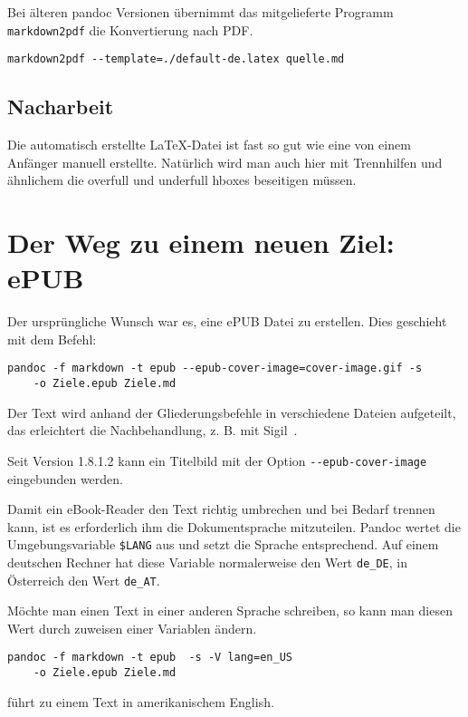 \documentclass[11pt,ngerman,a4paper]{article}
\begin{document}
Bei älteren pandoc Versionen übernimmt das mitgelieferte Programm
\texttt{markdown2pdf} die Konvertierung nach PDF.

\begin{verbatim}
markdown2pdf --template=./default-de.latex quelle.md
\end{verbatim}

\subsection{Nacharbeit}

Die automatisch erstellte LaTeX-Datei ist fast so gut wie eine von einem
Anfänger manuell erstellte. Natürlich wird man auch hier mit Trennhilfen
und ähnlichem die overfull und underfull hboxes beseitigen müssen.

\section{Der Weg zu einem neuen Ziel: ePUB}

Der ursprüngliche Wunsch war es, eine ePUB Datei zu erstellen. Dies
geschieht mit dem Befehl:

\begin{verbatim}
pandoc -f markdown -t epub --epub-cover-image=cover-image.gif -s
    -o Ziele.epub Ziele.md
\end{verbatim}

Der Text wird anhand der Gliederungsbefehle in verschiedene Dateien
aufgeteilt, das erleichtert die Nachbehandlung, z. B. mit
Sigil~\autocite{sigil}.

Seit Version 1.8.1.2 kann ein Titelbild mit der Option
\texttt{-{}-epub-cover-image} eingebunden werden.

Damit ein eBook-Reader den Text richtig umbrechen und bei Bedarf trennen
kann, ist es erforderlich ihm die Dokumentsprache mitzuteilen. Pandoc
wertet die Umgebungsvariable \texttt{\$LANG} aus und setzt die Sprache
entsprechend. Auf einem deutschen Rechner hat diese Variable
normalerweise den Wert \texttt{de\_DE}, in Österreich den Wert
\texttt{de\_AT}.

Möchte man einen Text in einer anderen Sprache schreiben, so kann man
diesen Wert durch zuweisen einer Variablen ändern.

\begin{verbatim}
pandoc -f markdown -t epub  -s -V lang=en_US
    -o Ziele.epub Ziele.md
\end{verbatim}

führt zu einem Text in amerikanischem English.
\end{document}
